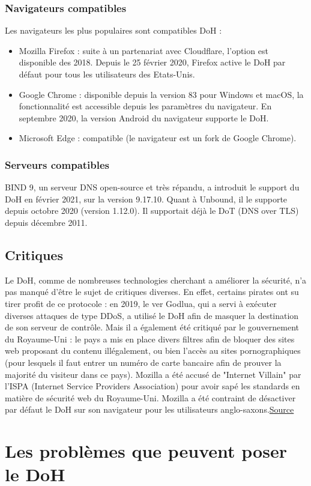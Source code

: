 \documentclass[a4paper,12pt]{article}
\begin{document}
	\subsubsection{Navigateurs compatibles}
	Les navigateurs les plus populaires sont compatibles DoH :
	\begin{itemize}
		\item Mozilla Firefox : suite à un partenariat avec Cloudflare, l'option est disponible des 2018. Depuis le 25 février 2020, Firefox active le DoH par défaut pour tous les utilisateurs des Etats-Unis.
		\item Google Chrome : disponible depuis la version 83 pour Windows et macOS, la fonctionnalité est accessible depuis les paramètres du navigateur. En septembre 2020, la version Android du navigateur supporte le DoH.
		\item Microsoft Edge : compatible (le navigateur est un fork de Google Chrome).
	\end{itemize}
	\subsubsection{Serveurs compatibles}
	BIND 9, un serveur DNS open-source et très répandu, a introduit le support du DoH en février 2021, sur la version 9.17.10.
	Quant à Unbound, il le supporte depuis octobre 2020 (version 1.12.0). Il supportait déjà le DoT (DNS over TLS) depuis décembre 2011.
	\subsection{Critiques}
	Le DoH, comme de nombreuses technologies cherchant a améliorer la sécurité, n'a pas manqué d'être le sujet de critiques diverses. En effet, certains pirates ont su tirer profit de ce protocole : en 2019, le ver Godlua, qui a servi à exécuter diverses attaques de type DDoS, a utilisé le DoH afin de masquer la destination de son serveur de contrôle.
	Mais il a également été critiqué par le gouvernement du Royaume-Uni : le pays a mis en place divers filtres afin de bloquer des sites web proposant du contenu illégalement, ou bien l'accès au sites pornographiques (pour lesquels il faut entrer un numéro de carte bancaire afin de prouver la majorité du visiteur dans ce pays). Mozilla a été accusé de "Internet Villain" par l'ISPA (Internet Service Providers Association) pour avoir sapé les standards en matière de sécurité web du Royaume-Uni. Mozilla a été contraint de désactiver par défaut le DoH sur son navigateur pour les utilisateurs anglo-saxons.\href{https://www.theguardian.com/technology/2019/sep/24/firefox-no-uk-plans-to-make-encrypted-browser-tool-its-default}{Source}
	\section{Les problèmes que peuvent poser le DoH}	
	
\end{document}
